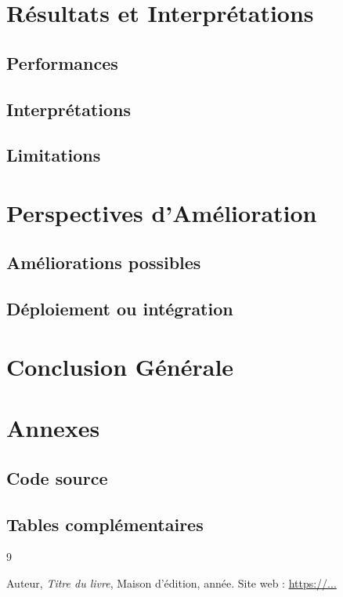 \documentclass[12pt,a4paper]{report}
\begin{document}
\chapter{Résultats et Interprétations}
\section{Performances}
\section{Interprétations}
\section{Limitations}

\chapter{Perspectives d'Amélioration}
\section{Améliorations possibles}
\section{Déploiement ou intégration}

\chapter{Conclusion Générale}
\lipsum[3]

\appendix
\chapter{Annexes}
\section{Code source}
\section{Tables complémentaires}

\begin{thebibliography}{9}
 Auteur, \textit{Titre du livre}, Maison d'édition, année.
 Site web : \url{https://...}
\end{thebibliography}
\end{document}
